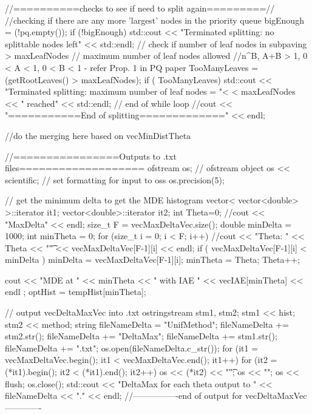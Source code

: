 \begin{DoxyCode}
{{{        //==========checks to see if need to split again=========//
            //checking if there are any more 'largest' nodes in the priority
       queue
            bigEnough = (!pq.empty());
            if (!bigEnough){    
          std::cout << "Terminated splitting: no splittable nodes left"
                    << std::endl;
            }
        // check if number of leaf nodes in subpaving > maxLeafNodes
        // maximum number of leaf nodes allowed
        //n^B, A+B > 1, 0  < A < 1, 0 < B < 1 - refer Prop. 1 in PQ paper
        TooManyLeaves = (getRootLeaves() > maxLeafNodes);
        if ( TooManyLeaves) {
          std::cout << "Terminated splitting: maximum number of leaf nodes = "<
      < maxLeafNodes << " reached"
                          << std::endl;
        }
      } // end of while loop
      //cout << "===========End of splitting=============" << endl;
        
      //do the merging here based on vecMinDistTheta
         
      //================Outputs to .txt files=================== 
      ofstream os;         // ofstream object
      os << scientific;  // set formatting for input to oss
      os.precision(5);

       // get the minimum delta to get the MDE histogram
      vector< vector<double> >::iterator it1; 
      vector<double>::iterator it2;
      int Theta=0;
      //cout << "MaxDelta" << endl;
      size_t F = vecMaxDeltaVec.size(); 
      double minDelta = 1000;
      int minTheta = 0;
      for (size_t i = 0; i < F; i++){
        //cout << "Theta: " << Theta << "\t" << vecMaxDeltaVec[F-1][i] << endl;
        if ( vecMaxDeltaVec[F-1][i] < minDelta ) { 
          minDelta = vecMaxDeltaVec[F-1][i]; 
          minTheta = Theta; 
        } 
        Theta++;
      }

      cout << "MDE at " << minTheta << " with IAE " << vecIAE[minTheta] << endl
      ; 
         optHist = tempHist[minTheta];

      // output vecDeltaMaxVec into .txt 
      ostringstream stm1, stm2;
      stm1 << hist;
      stm2 << method;
      string fileNameDelta = "UnifMethod";
      fileNameDelta += stm2.str();
      fileNameDelta += "DeltaMax";
      fileNameDelta += stm1.str();
      fileNameDelta += ".txt";  
      os.open(fileNameDelta.c_str());
      for (it1 = vecMaxDeltaVec.begin(); it1 < vecMaxDeltaVec.end(); it1++){ 
        for (it2 = (*it1).begin(); it2 < (*it1).end(); it2++){
          os << (*it2) << "\t";
        }
        os << "\n";
      }          
      os << flush;
      os.close();
      std::cout << "DeltaMax for each theta output to " << fileNameDelta << "."
       << endl;
      //----------------end of output for vecDeltaMaxVec-------------
 
}}
\end{DoxyCode}
